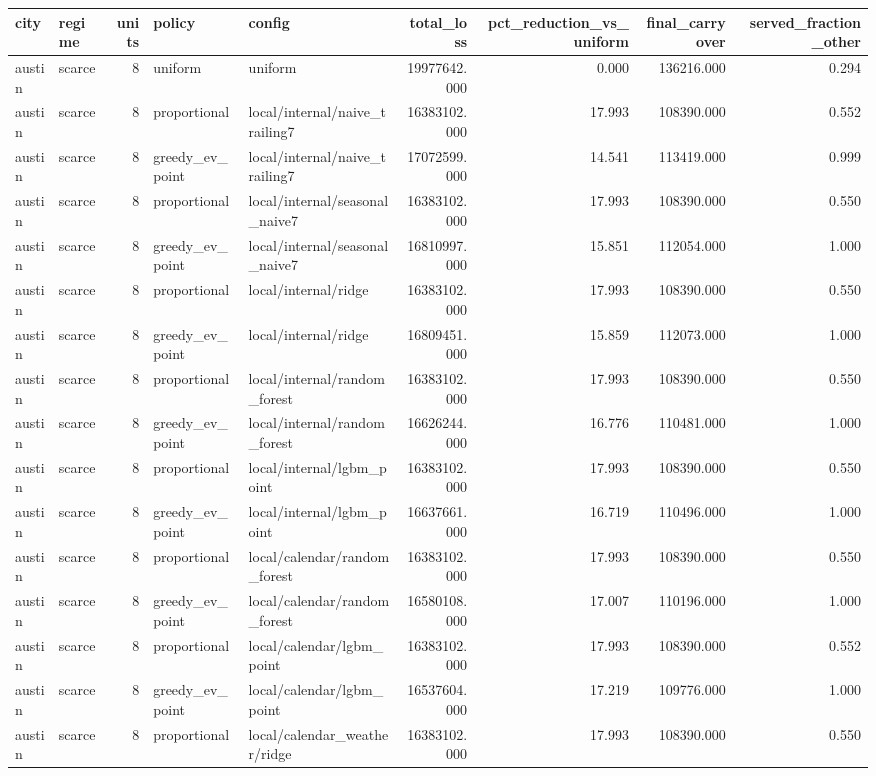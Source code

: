 \begin{tabular}{llrllrrrr}
\toprule
city & regime & units & policy & config & total\_loss & pct\_reduction\_vs\_uniform & final\_carryover & served\_fraction\_other \\
\midrule
austin & scarce & 8 & uniform & uniform & 19977642.000 & 0.000 & 136216.000 & 0.294 \\
austin & scarce & 8 & proportional & local/internal/naive\_trailing7 & 16383102.000 & 17.993 & 108390.000 & 0.552 \\
austin & scarce & 8 & greedy\_ev\_point & local/internal/naive\_trailing7 & 17072599.000 & 14.541 & 113419.000 & 0.999 \\
austin & scarce & 8 & proportional & local/internal/seasonal\_naive7 & 16383102.000 & 17.993 & 108390.000 & 0.550 \\
austin & scarce & 8 & greedy\_ev\_point & local/internal/seasonal\_naive7 & 16810997.000 & 15.851 & 112054.000 & 1.000 \\
austin & scarce & 8 & proportional & local/internal/ridge & 16383102.000 & 17.993 & 108390.000 & 0.550 \\
austin & scarce & 8 & greedy\_ev\_point & local/internal/ridge & 16809451.000 & 15.859 & 112073.000 & 1.000 \\
austin & scarce & 8 & proportional & local/internal/random\_forest & 16383102.000 & 17.993 & 108390.000 & 0.550 \\
austin & scarce & 8 & greedy\_ev\_point & local/internal/random\_forest & 16626244.000 & 16.776 & 110481.000 & 1.000 \\
austin & scarce & 8 & proportional & local/internal/lgbm\_point & 16383102.000 & 17.993 & 108390.000 & 0.550 \\
austin & scarce & 8 & greedy\_ev\_point & local/internal/lgbm\_point & 16637661.000 & 16.719 & 110496.000 & 1.000 \\
austin & scarce & 8 & proportional & local/calendar/random\_forest & 16383102.000 & 17.993 & 108390.000 & 0.550 \\
austin & scarce & 8 & greedy\_ev\_point & local/calendar/random\_forest & 16580108.000 & 17.007 & 110196.000 & 1.000 \\
austin & scarce & 8 & proportional & local/calendar/lgbm\_point & 16383102.000 & 17.993 & 108390.000 & 0.552 \\
austin & scarce & 8 & greedy\_ev\_point & local/calendar/lgbm\_point & 16537604.000 & 17.219 & 109776.000 & 1.000 \\
austin & scarce & 8 & proportional & local/calendar\_weather/ridge & 16383102.000 & 17.993 & 108390.000 & 0.550 \\

\end{tabular}

